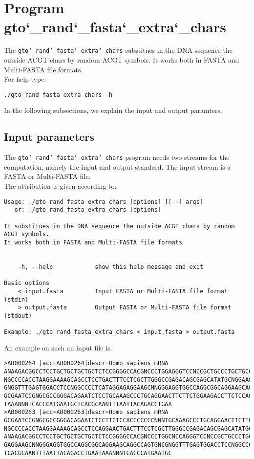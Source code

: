 \section{Program gto\char`_rand\char`_fasta\char`_extra\char`_chars}
The \texttt{gto\char`_rand\char`_fasta\char`_extra\char`_chars} substitues in the DNA sequence the outside ACGT chars by random ACGT symbols. It works both in FASTA and Multi-FASTA file formats.\\
For help type:
\begin{lstlisting}
./gto_rand_fasta_extra_chars -h
\end{lstlisting}
In the following subsections, we explain the input and output paramters.

\subsection*{Input parameters}

The \texttt{gto\char`_rand\char`_fasta\char`_extra\char`_chars} program needs two streams for the computation,
namely the input and output standard. The input stream is a FASTA or Multi-FASTA file.\\
The attribution is given according to:
\begin{lstlisting}
Usage: ./gto_rand_fasta_extra_chars [options] [[--] args]
   or: ./gto_rand_fasta_extra_chars [options]

It substitues in the DNA sequence the outside ACGT chars by random ACGT symbols.
It works both in FASTA and Multi-FASTA file formats


    -h, --help            show this help message and exit

Basic options
    < input.fasta         Input FASTA or Multi-FASTA file format (stdin)
    > output.fasta        Output FASTA or Multi-FASTA file format (stdout)

Example: ./gto_rand_fasta_extra_chars < input.fasta > output.fasta
\end{lstlisting}
An example on such an input file is:
\begin{lstlisting}
>AB000264 |acc=AB000264|descr=Homo sapiens mRNA 
ANAAGACGGCCTCCTGCTGCTGCTGCTCTCCGGGGCCACGNCCCTGGAGGGTCCNCCGCTGCCCTGCTGCCATTGNCNCC
NGCCCCACCTAAGGAAAAGCAGCCTCCTGACTTTCCTCGCTTGGGCCGAGACAGCGAGCATATGCNGGAAGCGGCAGGAA
GNGGTTTGAGTGGACCTCCNGGCCCCTCATAGGAGAGGAAGCNNGGGAGGTGGCCAGGCGGCAGGAAGCAGGCCAGTGNC
GCGAATCCGNGCGCCGGGACAGAATCTCCTGCAAAGCCCTGCAGGAACTTCTTCTGGAAGACCTTCTCCACCCCCCCNNN
TAAANNNTCACCCATGAATGCTCACGCAANTTTAATTACAGACCTGAA
>AB000263 |acc=AB000263|descr=Homo sapiens mRNA 
GCGAATCCGNGCGCCGGGACAGAATCTCCTTCTCCACCCCCCCNNNTGCAAAGCCCTGCAGGAACTTCTTCTGGAAGACC
NGCCCCACCTAAGGAAAAGCAGCCTCCAGGAACTGACTTTCCTCGCTTGGGCCGAGACAGCGAGCATATGCNGGAAGCGG
ANAAGACGGCCTCCTGCTGCTGCTGCTCTCCGGGGCCACGNCCCTGGCNCCAGGGTCCNCCGCTGCCCTGCTGCCATTGN
GAGGAAGCNNGGGAGGTGGCCAGGCGGCAGGAAGCAGGCCAGTGNCGNGGTTTGAGTGGACCTCCNGGCCCCTCATAGGA
TCACGCAANTTTAATTACAGACCTGAATAAANNNTCACCCATGAATGC
\end{lstlisting}


